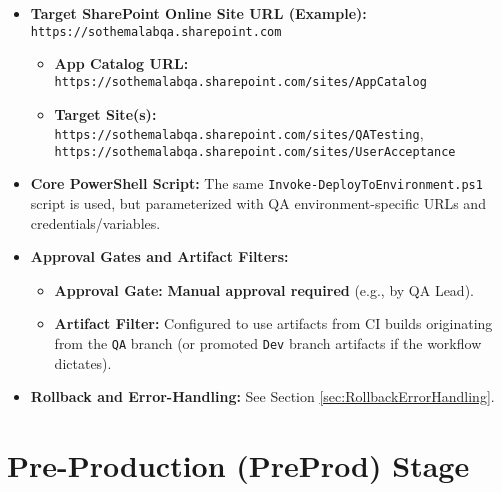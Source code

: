 \begin{itemize}
    \item \textbf{Target SharePoint Online Site URL (Example):} \texttt{https://sothemalabqa.sharepoint.com}
    \begin{itemize}
        \item \textbf{App Catalog URL:} \texttt{https://sothemalabqa.sharepoint.com/sites/AppCatalog}
        \item \textbf{Target Site(s):} \texttt{https://sothemalabqa.sharepoint.com/sites/QATesting}, \texttt{https://sothemalabqa.sharepoint.com/sites/UserAcceptance}
    \end{itemize}
    \item \textbf{Core PowerShell Script:} The same \texttt{Invoke-DeployToEnvironment.ps1} script is used, but parameterized with QA environment-specific URLs and credentials/variables.
    \item \textbf{Approval Gates and Artifact Filters:}
    \begin{itemize}
        \item \textbf{Approval Gate:} \textbf{Manual approval required} (e.g., by QA Lead).
        \item \textbf{Artifact Filter:} Configured to use artifacts from CI builds originating from the \texttt{QA} branch (or promoted \texttt{Dev} branch artifacts if the workflow dictates).
    \end{itemize}
    \item \textbf{Rollback and Error-Handling:} See Section \ref{sec:RollbackErrorHandling}.
\end{itemize}

\section{Pre-Production (PreProd) Stage}
\label{sec:PreProdStage}

